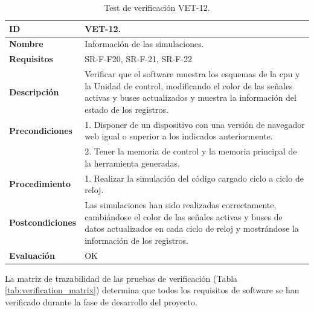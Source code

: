 \begin{center}
\begin{table}[htb]
\centering
\caption{Test de verificación VET-12.}
\begin{tabular}{@{}p{2.5cm} p{13cm}@{}} 
\toprule
\textbf{ID} 					& VET-12. \\
\midrule
\textbf{Nombre} 				& Información de las simulaciones. \\
\midrule
\textbf{Requisitos} 		& SR-F-F20, SR-F-21, SR-F-22\\
\midrule
\textbf{Descripción} 		& Verificar que el \gls{software} muestra los esquemas de la \acrshort{cpu} y la Unidad de control, modificando el color de las señales activas y buses actualizados y muestra la información del estado de los registros. \\
\midrule
\textbf{Precondiciones}		& 1. Disponer de un dispositivo con una versión de navegador web igual o superior a los indicados anteriormente. \\
											& 2. Tener la memoria de control y la memoria principal de la herramienta generadas. \\
\midrule
\textbf{Procedimiento}		& 1. Realizar la simulación del código cargado ciclo a ciclo de reloj.\\
\midrule
\textbf{Postcondiciones} 		&  Las simulaciones han sido realizadas correctamente, cambiándose el color de las señales activas y buses de datos actualizados en cada ciclo de reloj y mostrándose la información de los registros.\\
\midrule
\textbf{Evaluación} 			& OK \\
\bottomrule
\end{tabular}
\label{tab:vet12}
\end{table}
\end{center}

\clearpage



La matriz de trazabilidad de las pruebas de verificación (Tabla \ref{tab:verification_matrix}) determina que todos los requisitos de \gls{software} se han verificado durante la fase de desarrollo del proyecto.

\vspace{2cm}


